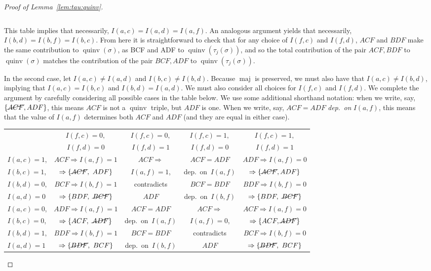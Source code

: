 \documentclass[ALCO,Unicode]{cedram}
\DeclareMathOperator{\maj}{maj}
\DeclareMathOperator{\quinv}{quinv}
\begin{document}
\begin{proof}[Proof of Lemma~\ref{lem:tau:quinv}]
\begin{center}
{\begin{tabular}{l|c|c|}
\end{tabular}
}
\end{center}
 
This table implies that necessarily, $I(a,c)=I(a,d)=I(a,f)$.
An analogous argument yields that necessarily, $I(b,d)=I(b,f)=I(b,c)$. From here it is straightforward to check that for any choice of $I(f,c)$ and $I(f,d)$, $ACF$ and $BDF$ make the same contribution to $\quinv(\sigma)$, as BCF and ADF to $\quinv(\tau_j(\sigma))$, and so the total contribution of the pair $ACF, BDF$ to $\quinv(\sigma)$ matches the contribution of the pair $BCF, ADF$ to $\quinv(\tau_j(\sigma))$.  

In the second case, let $I(a,c)\neq I(a,d)$ and $I(b,c)\neq I(b,d)$. Because $\maj$ is preserved, we must also have that $I(a,c)\neq I(b,d)$, implying that $I(a,c)=I(b,c)$ and $I(b,d)=I(a,d)$. We must also consider all choices for $I(f,c)$ and $I(f,d)$. We complete the argument by carefully considering all possible cases in the table below. We use some additional shorthand notation: when we write, say, $\{\cancel{ACF}, ADF\}$, this means $ACF$ is not a $\quinv$ triple, but $ADF$ is one. When we write, say, $ACF=ADF$ \emph{dep.~on} $I(a,f)$, this means that the value of $I(a,f)$ determines both $ACF$ and $ADF$ (and they are equal in either case).

{\renewcommand{\arraystretch}{1.2}
\flushleft
\footnotesize
\begin{tabular}{l|c|c|c|c|}
& $I(f,c)=0,$ & $I(f,c)=0,$ & $I(f,c)=1,$ & $I(f,c)=1,$\\ 
& $I(f,d)=0$ & $I(f,d)=1$ & $I(f,d)=0$ & $I(f,d)=1$\\ \hline
$I(a,c)=1$, & $ACF \Rightarrow I(a,f)=1$ & $ACF \Rightarrow$ & $ACF=ADF$ & $ADF \Rightarrow I(a,f)=0$  \\
$I(b,c)=1$,& $\Rightarrow\{\cancel{ACF},\ ADF\}$ & $I(a,f)=1$, &dep.~on~$I(a,f)$ & $\Rightarrow\{\cancel{ACF}, ADF\}$  \\
$I(b,d)=0$, & $BCF \Rightarrow I(b,f)=1$ & contradicts & $BCF=BDF$  & $BDF \Rightarrow I(b,f)=0$  \\ 
$I(a,d)=0$& $\Rightarrow \{BDF,\ \cancel{BCF}\}$ & $ADF$ &dep.~on~$I(b,f)$ & $\Rightarrow \{BDF,\ \cancel{BCF}\}$  \\\hline
$I(a,c)=0$, & $ADF \Rightarrow I(a,f)=1$ & $ACF=ADF$ & $ACF \Rightarrow$ & $ACF \Rightarrow I(a,f)=0$  \\
$I(b,c)=0$,& $\Rightarrow \{ACF,\ \cancel{ADF}\}$ &dep.~on~$I(a,f)$ & $I(a,f)=0$, & $\Rightarrow \{ACF, \cancel{ADF}\}$  \\
$I(b,d)=1$, & $BDF \Rightarrow I(b,f)=1$ & $BCF=BDF$ & contradicts  & $BCF \Rightarrow I(b,f)=0$  \\ 
$I(a,d)=1$& $\Rightarrow\{\cancel{BDF},\ BCF\}$ &dep.~on~$I(b,f)$ & 
$ADF$ & $\Rightarrow\{\cancel{BDF},\ BCF\}$  \\\hline
\end{tabular}
}


\end{proof}
\end{document}
